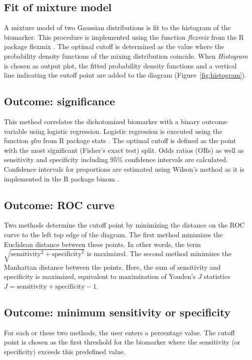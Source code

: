 \documentclass[12pt, a4paper]{article}
\begin{document}
\subsection{Fit of mixture model}
A mixture model of two Gaussian distributions is fit to the histogram of the biomarker.
This procedure is implemented using the function \emph{flexmix} from the R package flexmix \cite{Leisch2004}.
The optimal cutoff is determined as the value where the probability density functions of the mixing distribution coincide.
When \emph{Histogram} is chosen as output plot, the fitted probability density functions and a vertical line indicating the cutoff point are added to the diagram (Figure~\ref{fig:histogram}).

\subsection{Outcome: significance}
This method correlates the dichotomized biomarker with a binary outcome variable using logistic regression.
Logistic regression is executed using the function \emph{glm} from R package stats \cite{R}.
The optimal cutoff is defined as the point with the most significant (Fisher's exact test) split.
Odds ratios (ORs) as well as sensitivity and specificity including 95\% confidence intervals are calculated.
Confidence intervals for proportions are estimated using Wilson's method as it is implemented in the R package binom \cite{binom}.

\subsection{Outcome: ROC curve}
Two methods determine the cutoff point by minimizing the distance on the ROC curve to the left top edge of the diagram.
The first method minimizes the Euclidean distance between these points.
In other words, the term $\sqrt{\mathrm{sensitivity}^2 + \mathrm{specificity}^2}$ is maximized.
The second method minimizes the Manhattan distance between the points.
Here, the sum of sensitivity and specificity is maximized, equivalent to maximization of Youden's $J$ statistics $J = \mathrm{sensitivity} + \mathrm{specificity} - 1$.

\subsection{Outcome: minimum sensitivity or specificity}
For each or these two methods, the user enters a percentage value.
The cutoff point is chosen as the first threshold for the biomarker where the sensitivity (or specificity) exceeds this predefined value.
\end{document}
